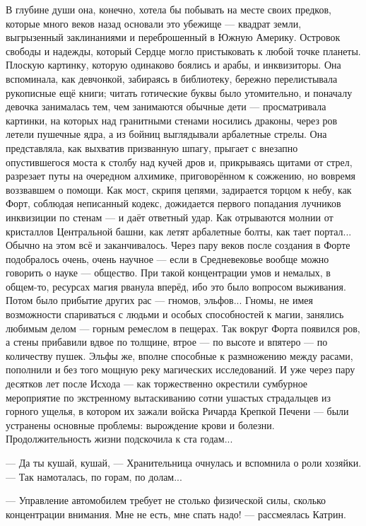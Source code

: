 В глубине души она, конечно, хотела бы побывать на месте своих предков, которые много веков назад основали это убежище ---
квадрат земли, выгрызенный заклинаниями и переброшенный в Южную Америку.
Островок свободы и надежды, который Сердце могло пристыковать к любой точке планеты.
Плоскую картинку, которую одинаково боялись и арабы, и инквизиторы.
Она вспоминала, как девчонкой, забираясь в библиотеку, бережно перелистывала рукописные ещё книги;
читать готические буквы было утомительно, и поначалу девочка занималась тем, чем занимаются обычные дети ---
просматривала картинки, на которых над гранитными стенами носились драконы, через ров летели пушечные ядра,
а из бойниц выглядывали арбалетные стрелы. Она представляла, как выхватив призванную шпагу,
прыгает с внезапно опустившегося моста к столбу над кучей дров и, прикрываясь щитами от стрел,
разрезает путы на очередном алхимике, приговорённом к сожжению, но вовремя воззвавшем о помощи.
Как мост, скрипя цепями, задирается торцом к небу, как Форт, соблюдая неписанный кодекс,
дожидается первого попадания лучников инквизиции по стенам --- и даёт ответный удар.
Как отрываются молнии от кристаллов Центральной башни, как летят арбалетные болты, как тает портал...
Обычно на этом всё и заканчивалось. Через пару веков после создания в Форте подобралось очень, очень научное ---
если в Средневековье вообще можно говорить о науке --- общество. При такой концентрации умов и немалых, в общем-то,
ресурсах магия рванула вперёд, ибо это было вопросом выживания.
Потом было прибытие других рас --- гномов, эльфов...
Гномы, не имея возможности спариваться с людьми и особых способностей к магии,
занялись любимым делом --- горным ремеслом в пещерах. Так вокруг Форта появился ров, а стены прибавили вдвое по толщине,
втрое --- по высоте и впятеро --- по количеству пушек. Эльфы же, вполне способные к размножению между расами,
пополнили и без того мощную реку магических исследований. И уже через пару десятков лет после Исхода ---
как торжественно окрестили сумбурное мероприятие по экстренному вытаскиванию сотни ушастых страдальцев из горного ущелья,
в котором их зажали войска Ричарда Крепкой Печени --- были устранены основные проблемы:
вырождение крови и болезни. Продолжительность жизни подскочила к ста годам...

--- Да ты кушай, кушай, --- Хранительница очнулась и вспомнила о роли хозяйки. --- Так намоталась, по горам, по долам...

--- Управление автомобилем требует не столько физической силы, сколько концентрации внимания.
Мне не есть, мне спать надо! --- рассмеялась Катрин.

